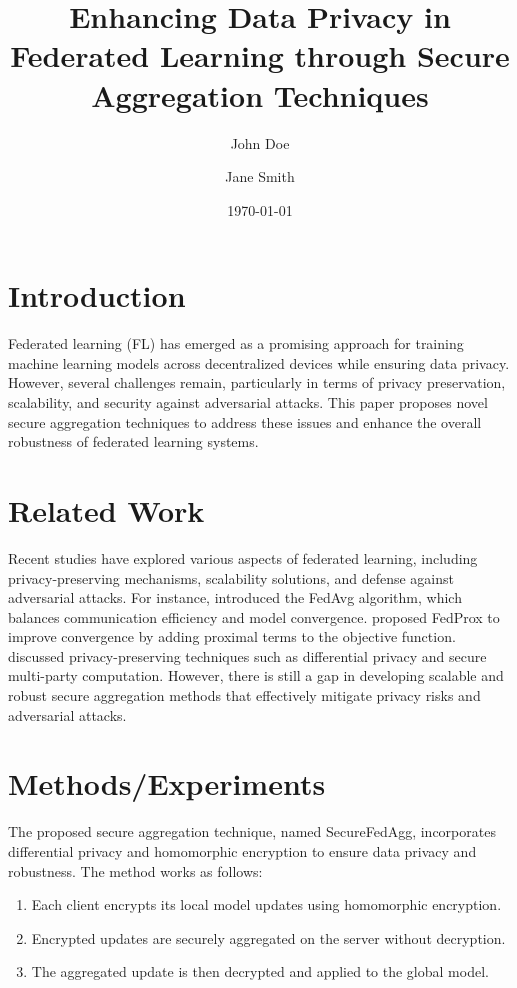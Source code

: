 \documentclass{article}
\title{Enhancing Data Privacy in Federated Learning through Secure Aggregation Techniques}
\author{John Doe \and Jane Smith}
\date{\today}
\begin{document}
\maketitle

\section{Introduction}
Federated learning (FL) has emerged as a promising approach for training machine learning models across decentralized devices while ensuring data privacy. However, several challenges remain, particularly in terms of privacy preservation, scalability, and security against adversarial attacks. This paper proposes novel secure aggregation techniques to address these issues and enhance the overall robustness of federated learning systems.

\section{Related Work}
Recent studies have explored various aspects of federated learning, including privacy-preserving mechanisms, scalability solutions, and defense against adversarial attacks. For instance, \cite{mcmahan2017communication} introduced the FedAvg algorithm, which balances communication efficiency and model convergence. \cite{wang2018federated} proposed FedProx to improve convergence by adding proximal terms to the objective function. \cite{song2019privacy} discussed privacy-preserving techniques such as differential privacy and secure multi-party computation. However, there is still a gap in developing scalable and robust secure aggregation methods that effectively mitigate privacy risks and adversarial attacks.

\section{Methods/Experiments}
The proposed secure aggregation technique, named SecureFedAgg, incorporates differential privacy and homomorphic encryption to ensure data privacy and robustness. The method works as follows:
\begin{enumerate}
    \item Each client encrypts its local model updates using homomorphic encryption.
    \item Encrypted updates are securely aggregated on the server without decryption.
    \item The aggregated update is then decrypted and applied to the global model.
\end{enumerate}
\end{document}

